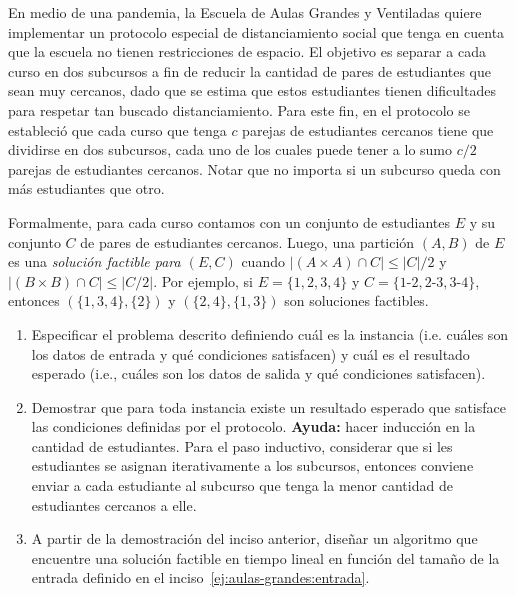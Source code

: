 
\item En medio de una pandemia, la Escuela de Aulas Grandes y Ventiladas quiere implementar un protocolo especial de distanciamiento social que tenga en cuenta que la escuela no tienen restricciones de espacio.  El objetivo es separar a cada curso en dos subcursos a fin de reducir la cantidad de pares de estudiantes que sean muy cercanos, dado que se estima que estos estudiantes tienen dificultades para respetar tan buscado distanciamiento.  Para este fin, en el protocolo se estableció que cada curso que tenga $c$ parejas de estudiantes cercanos tiene que dividirse en dos subcursos, cada uno de los cuales puede tener a lo sumo $c/2$ parejas de estudiantes cercanos.  Notar que no importa si un subcurso queda con más estudiantes que otro.

Formalmente, para cada curso contamos con un conjunto de estudiantes $E$ y su conjunto $C$ de pares de estudiantes cercanos.  Luego, una partición $(A,B)$ de $E$ es una \emph{solución factible para $(E, C)$} cuando $|(A\times A) \cap C| \leq |C|/2$ y $|(B \times B) \cap C| \leq |C/2|$.  Por ejemplo, si $E = \{1, 2, 3, 4\}$ y $C = \{1\text{-}2, 2\text{-}3, 3\text{-}4\}$, entonces $(\{1,3,4\}, \{2\})$ y $(\{2,4\}, \{1,3\})$ son soluciones factibles.

\begin{enumerate}[label=$\alph*)$, ref=$\alph*)$]
 \item Especificar el problema descrito definiendo cuál es la instancia (i.e. cuáles son los datos de entrada y qué condiciones satisfacen) y cuál es el resultado esperado (i.e., cuáles son los datos de salida y qué condiciones satisfacen).\label{ej:aulas-grandes:entrada}
 \item Demostrar que para toda instancia existe un resultado esperado que satisface las condiciones definidas por el protocolo.  \textbf{Ayuda:} hacer inducción en la cantidad de estudiantes.  Para el paso inductivo, considerar que si les estudiantes se asignan iterativamente a los subcursos, entonces conviene enviar a cada estudiante al subcurso que tenga la menor cantidad de estudiantes cercanos a elle.
 \item A partir de la demostración del inciso anterior, diseñar un algoritmo que encuentre una solución factible en tiempo lineal en función del tamaño de la entrada definido en el inciso~\ref{ej:aulas-grandes:entrada}.
\end{enumerate}


